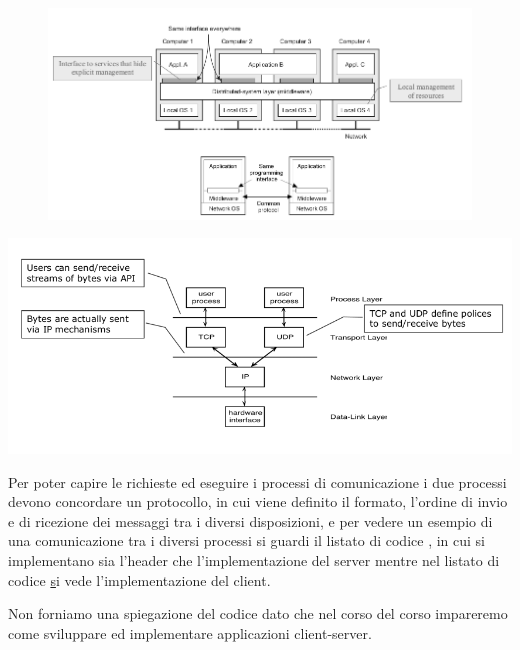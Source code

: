 \documentclass[a4paper,12pt, oneside]{book}
\begin{document}
\begin{figure}
\centering
\label{figura:interfaccia}
\includegraphics[scale=2]{img/cli4.png}
\end{figure}
\begin{center}
	\includegraphics[scale=2]{img/cli5.png}
\end{center}
Per poter capire le richieste ed eseguire i processi di comunicazione i due processi devono concordare 
un protocollo, in cui viene definito il formato, l'ordine di invio e di ricezione dei messaggi tra 
i diversi disposizioni, e per vedere un esempio di una comunicazione tra i diversi processi si guardi
il listato di codice \href{listato:fileServer}, in cui si implementano sia l'header che l'implementazione
del server mentre nel listato di codice \href{listato:fileClient} si vede l'implementazione del client.

Non forniamo una spiegazione del codice dato che nel corso del corso impareremo come sviluppare ed
implementare applicazioni client-server.

\begin{figure}
    \label{listato:fileServer}
    \inputminted{c}{code/header.h}
    \inputminted{c}{code/fileServer.c}
\end{figure}

\begin{figure}
    \label{listato:fileClient}
    \inputminted{c}{code/fileClient.c}
\end{figure}
\end{document}
